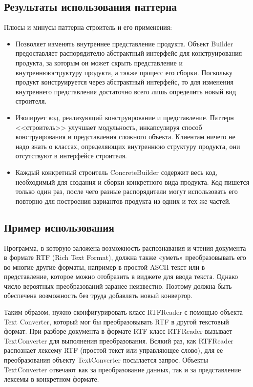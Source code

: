 \subsection{Результаты использования паттерна}

Плюсы и минусы паттерна строитель и его применения:
\begin{itemize}
\item
  Позволяет изменять внутреннее представление продукта.
  Объект Builder предоставляет распорядителю абстрактный интерфейс
  для конструирования продукта, за которым он может скрыть представление
  и внутреннююструктуру продукта, а также процесс его сборки.
  Поскольку продукт конструируется через абстрактный интерфейс,
  то для изменения внутреннего представления достаточно всего лишь
  определить новый вид строителя.
\item
  Изолирует код, реализующий конструирование и представление.
  Паттерн <<строитель>> улучшает модульность, инкапсулируя способ конструирования
  и представления сложного объекта. Клиентам ничего не надо знать о 
  классах, определяющих внутреннюю структуру продукта, они отсутствуют
  в интерфейсе строителя.
\item
  Каждый конкретный строитель ConcreteBuilder содержит весь код,
  необходимый для создания и сборки конкретного вида продукта. Код пишется
  только один раз, после чего разные распорядители могут использовать
  его повторно для построения вариантов продукта из одних и тех же частей.
\end{itemize}

\subsection{Пример использования}

Программа, в которую заложена возможность распознавания и чтения документа
в формате RTF (Rich Text Format), должна также «уметь» преобразовывать
его во многие другие форматы, например в простой ASCII-текст или в
представление, которое можно отобразить в виджете для ввода текста.
Однако число вероятных преобразований заранее неизвестно.
Поэтому должна быть обеспечена возможность без труда добавлять новый конвертор.

Таким образом, нужно сконфигурировать класс RTFReader с помощью объекта
Text Converter, который мог бы преобразовывать RTF в другой текстовый
формат. При разборе документа в формате RTF класс RTFReader вызывает
TextConverter для выполнения преобразования. Всякий раз, как RTFReader
распознает лексему RTF (простой текст или управляющее слово), для ее
преобразования объекту TextConverter посылается запрос.
Объекты TextConverter отвечают как за преобразование данных,
так и за представление лексемы в конкретном формате.

